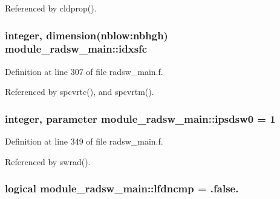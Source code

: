 Referenced by cldprop().

\subsubsection[{\texorpdfstring{idxsfc}{idxsfc}}]{\setlength{\rightskip}{0pt plus 5cm}integer, dimension(nblow\+:nbhgh) module\+\_\+radsw\+\_\+main\+::idxsfc\hspace{0.3cm}{\ttfamily [private]}}\hypertarget{namespacemodule__radsw__main_ad295d723dd7d269cb51c73923a4cbb94}{}\label{namespacemodule__radsw__main_ad295d723dd7d269cb51c73923a4cbb94}


Definition at line 307 of file radsw\+\_\+main.\+f.



Referenced by spcvrtc(), and spcvrtm().

\subsubsection[{\texorpdfstring{ipsdsw0}{ipsdsw0}}]{\setlength{\rightskip}{0pt plus 5cm}integer, parameter module\+\_\+radsw\+\_\+main\+::ipsdsw0 = 1\hspace{0.3cm}{\ttfamily [private]}}\hypertarget{namespacemodule__radsw__main_ae1f88a0b60d69b892cfae83bb9ab67df}{}\label{namespacemodule__radsw__main_ae1f88a0b60d69b892cfae83bb9ab67df}


Definition at line 349 of file radsw\+\_\+main.\+f.



Referenced by swrad().

\subsubsection[{\texorpdfstring{lfdncmp}{lfdncmp}}]{\setlength{\rightskip}{0pt plus 5cm}logical module\+\_\+radsw\+\_\+main\+::lfdncmp = .false.\hspace{0.3cm}{\ttfamily [private]}}\hypertarget{namespacemodule__radsw__main_a8c0a241d6c1aa69fee4cd24fdbc4256b}{}\label{namespacemodule__radsw__main_a8c0a241d6c1aa69fee4cd24fdbc4256b}


